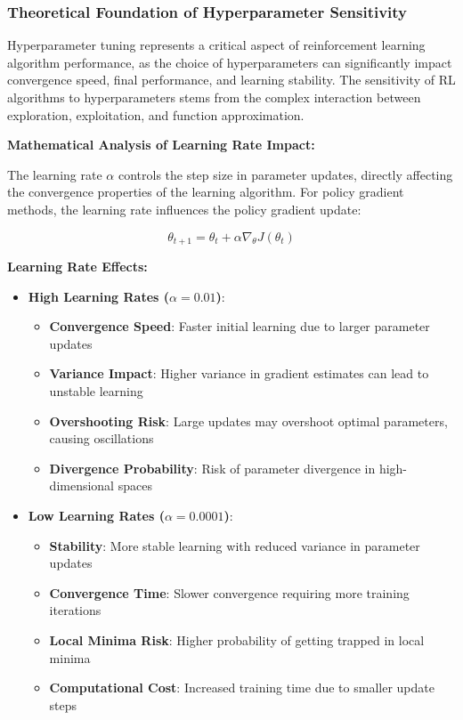 \documentclass[12pt]{article}
\begin{document}
{{{\subsubsection{Theoretical Foundation of Hyperparameter Sensitivity}

Hyperparameter tuning represents a critical aspect of reinforcement learning algorithm performance, as the choice of hyperparameters can significantly impact convergence speed, final performance, and learning stability. The sensitivity of RL algorithms to hyperparameters stems from the complex interaction between exploration, exploitation, and function approximation.

\textbf{Mathematical Analysis of Learning Rate Impact:}

The learning rate $\alpha$ controls the step size in parameter updates, directly affecting the convergence properties of the learning algorithm. For policy gradient methods, the learning rate influences the policy gradient update:

\begin{equation}
\theta_{t+1} = \theta_t + \alpha \nabla_\theta J(\theta_t)
\end{equation}

\textbf{Learning Rate Effects:}
\begin{itemize}
    \item \textbf{High Learning Rates ($\alpha = 0.01$)}: 
    \begin{itemize}
        \item \textbf{Convergence Speed}: Faster initial learning due to larger parameter updates
        \item \textbf{Variance Impact}: Higher variance in gradient estimates can lead to unstable learning
        \item \textbf{Overshooting Risk}: Large updates may overshoot optimal parameters, causing oscillations
        \item \textbf{Divergence Probability}: Risk of parameter divergence in high-dimensional spaces
    \end{itemize}
    
    \item \textbf{Low Learning Rates ($\alpha = 0.0001$)}:
    \begin{itemize}
        \item \textbf{Stability}: More stable learning with reduced variance in parameter updates
        \item \textbf{Convergence Time}: Slower convergence requiring more training iterations
        \item \textbf{Local Minima Risk}: Higher probability of getting trapped in local minima
        \item \textbf{Computational Cost}: Increased training time due to smaller update steps
    \end{itemize}
\end{itemize}

}}}
\end{document}
